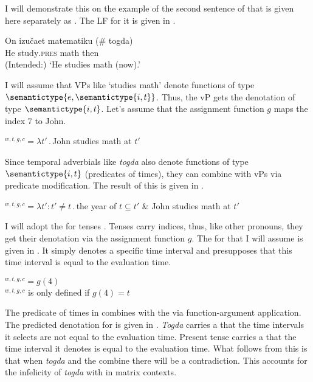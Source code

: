 \documentclass[output=paper,modfonts,newtxmath,hidelinks]{langscibook}
\begin{document}
I will demonstrate this on the example of the second sentence of  that is given here separately as . The LF for it is given in .

\ea \label{20:ex23}
\gll On izučaet matematiku (\#\hspace{-2pt} togda)\\
     He study\textsc{.pres} math {} then\\
\glt (Intended:) `He studies math (now).'
\z

\label{20:ex24}
\z

\noindent I will assume that VPs like ‘studies math’ denote functions of type $\semantictype{e,\semantictype{i,t}}$. Thus, the vP gets the denotation of type $\semantictype{i,t}$. Let's assume that the assignment function $g$ maps the index $7$ to John.

\ea {}$^{w,t,g,c}=\lambda t'\,.\,{}$John studies math at $t'$\label{20:ex25}
\z

\noindent Since temporal adverbials like \textit{togda} also denote functions of type $\semantictype{i,t}$ (predicates of times), they can combine with vPs via predicate modification. The result of this is given in .

\ea {}$^{w,t,g,c}=\lambda t':t'\neq t\,.\,{}$the year of $t\subseteq t'$ \& John studies math at $t'$\label{20:ex26}
\z

\noindent I will adopt the   for tenses \citep{Partee1973}. Tenses carry indices, thus, like other pronouns, they get their denotation via the assignment function $g$. The  for  that I will assume is given in . It simply denotes a specific time interval and presupposes that this time interval is equal to the evaluation time.

\ea {}$^{w,t,g,c}=g(4)$\smallskip\\
$^{w,t,g,c}$ is only defined if $g(4)=t$\label{20:ex27}
\z

\noindent The predicate of times in  combines with the  via function-argument application. The predicted denotation for  is given in . \textit{Togda} carries a  that the time intervals it selects are not equal to the evaluation time. Present tense carries a  that the time interval it denotes is equal to the evaluation time. What follows from this is that when \textit{togda} and the  combine there will be a contradiction. This accounts for the infelicity of \textit{togda} with  in matrix contexts.
\end{document}
